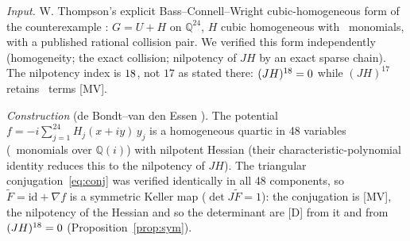 \documentclass[11pt]{article}
\theoremstyle{remark}
\newcommand{\Q}{\mathbb{Q}}
\begin{document}
\emph{Input.} W. Thompson's explicit Bass--Connell--Wright cubic-homogeneous form of the counterexample \cite{Thompson2026}: $G = U + H$ on $\Q^{24}$, $H$ cubic homogeneous with \nthompsonmon\ monomials, with a published rational collision pair. We verified this form independently (homogeneity; the exact collision; nilpotency of $JH$ by an exact sparse chain). The nilpotency index is $18$, not $17$ as stated there: $(JH)^{18} = 0$ while $(JH)^{17}$ retains \njhseventeen\ terms [MV].

\emph{Construction} (de Bondt--van den Essen \cite[eq.~(3), p.~2202; proof of Lemma~1.2, p.~2203]{dBvdE2005}). The potential $f = -i \sum_{j=1}^{24} H_j(x + iy)\, y_j$ is a homogeneous quartic in 48 variables (\npotentialmon\ monomials over $\Q(i)$) with nilpotent Hessian (their characteristic-polynomial identity reduces this to the nilpotency of $JH$). The triangular conjugation~\eqref{eq:conj} was verified identically in all 48 components, so $\widetilde F = \mathrm{id} + \nabla f$ is a symmetric Keller map ($\det J\widetilde F = 1$): the conjugation is [MV], the nilpotency of the Hessian and so the determinant are [D] from it and from $(JH)^{18}=0$ (Proposition~\ref{prop:sym}).
\end{document}

